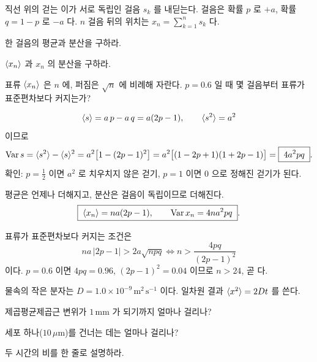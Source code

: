 

직선 위의 걷는 이가 서로 독립인 걸음 $s_k$ 를 내딛는다. 걸음은 확률 $p$ 로
$+a$, 확률 $q=1-p$ 로 $-a$ 다. $n$ 걸음 뒤의 위치는 $x_n=\sum_{k=1}^n s_k$ 다.
\begin{parts}
  \item 한 걸음의 평균과 분산을 구하라.
  \item $\langle x_n \rangle$ 과 $x_n$ 의 분산을 구하라.
  \item 표류 $\langle x_n \rangle$ 은 $n$ 에, 퍼짐은 $\sqrt n$ 에 비례해 자란다.
        $p=0.6$ 일 때 몇 걸음부터 표류가 표준편차보다 커지는가?
\end{parts}

\solution

\begin{equation}
  \langle s \rangle=a\,p-a\,q=a(2p-1),\qquad \langle s^2 \rangle=a^2
\end{equation}
이므로
\begin{equation}
  \operatorname{Var}s=\langle s^2 \rangle-\langle s \rangle^2=a^2\bigl[1-(2p-1)^2\bigr]
  =a^2\bigl[(1-2p+1)(1+2p-1)\bigr]=\boxed{\;4a^2pq\;}.
\end{equation}
확인: $p=\tfrac12$ 이면 $a^2$ 로 치우치지 않은 걷기, $p=1$ 이면 $0$ 으로 정해진
걷기가 된다.

평균은 언제나 더해지고, 분산은 걸음이 독립이므로 더해진다.
\begin{equation}
  \boxed{\;\langle x_n \rangle=na(2p-1),\qquad \operatorname{Var}x_n=4na^2pq\;}.
\end{equation}

표류가 표준편차보다 커지는 조건은
\begin{equation}
  na\,\lvert 2p-1\rvert>2a\sqrt{npq}
  \iff n>\frac{4pq}{(2p-1)^2}
\end{equation}
이다. $p=0.6$ 이면 $4pq=0.96$, $(2p-1)^2=0.04$ 이므로 $n>24$, 곧
 다.


물속의 작은 분자는 $D=1.0\times10^{-9}\,\mathrm{m^2\,s^{-1}}$ 이다.
일차원 결과 $\langle x^2 \rangle=2Dt$ 를 쓴다.
\begin{parts}
  \item 제곱평균제곱근 변위가 $1\,\mathrm{mm}$ 가 되기까지 얼마나 걸리나?
  \item 세포 하나($10\,\mu\mathrm{m}$)를 건너는 데는 얼마나 걸리나?
  \item 두 시간의 비를 한 줄로 설명하라.
\end{parts}

